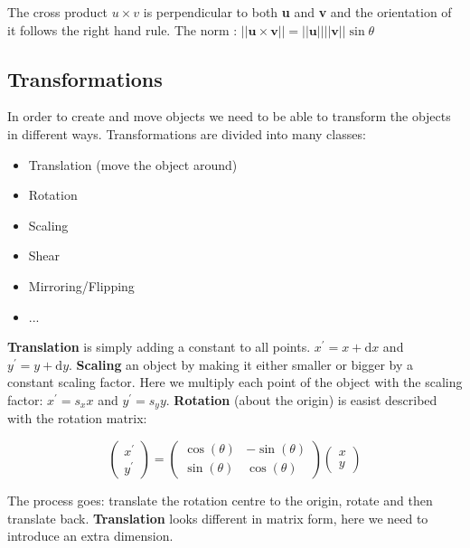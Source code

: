 	The cross product $u \times v$ is perpendicular to both \textbf{u} and \textbf{v} and the orientation of it follows the right hand rule. The norm : $||\textbf{u} \times \textbf{v}|| = ||\textbf{u}|| ||\textbf{v}|| \sin \theta$

	\subsection*{Transformations}
	In order to create and move objects we need to be able to transform the objects in different ways. Transformations are divided into many classes:
	\begin{itemize}
		\item Translation (move the object around)
		\item Rotation
		\item Scaling
		\item Shear
		\item Mirroring/Flipping
		\item ...
	\end{itemize}

	\noindent \textbf{Translation} is simply adding a constant to all points. $x^{\prime} = x + \text{d}x$ and  $y^{\prime} = y + \text{d}y$. \textbf{Scaling} an object by making it either smaller or bigger by a constant scaling factor. Here we multiply each point of the object with the scaling factor: $x^{\prime} = s_x x $ and $y^{\prime} = s_y y $. \textbf{Rotation} (about the origin) is easist described with the rotation matrix:

		\begin{equation}
			\begin{pmatrix} x^{\prime} \\ y^{\prime} \end{pmatrix} =
			\begin{pmatrix} \cos(\theta)& -\sin(\theta) \\ \sin(\theta)& \cos(\theta) \end{pmatrix} \begin{pmatrix} x \\ y \end{pmatrix}
		\end{equation}

	The process goes: translate the rotation centre to the origin, rotate and then translate back. 
	\noindent \textbf{Translation} looks different in matrix form, here we need to introduce an extra dimension.

